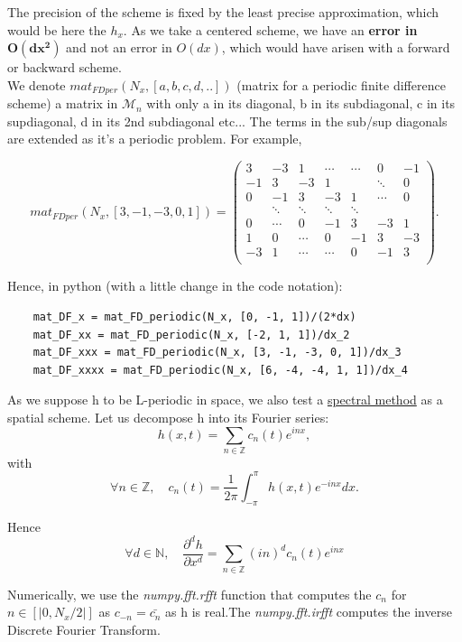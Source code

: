 \documentclass[12pt]{article}
\begin{document}
The precision of the scheme is fixed by the least precise approximation, which would be here the $h_x$. As we take a 
centered scheme, we have an \textbf{error in }$\boldsymbol{O(dx^2 )}$ and not an error in $O(dx)$, which would have 
arisen with a forward or backward scheme. \\

We denote $ mat_{FDper}(N_x, [a, b, c, d,..])$ (matrix for a periodic finite difference scheme) a matrix in $\mathcal{M}_n$ with only a in its diagonal, b in its subdiagonal, c in its supdiagonal, d in its 2nd subdiagonal etc... The terms in the sub/sup diagonals are extended as it's a periodic problem. For example, 

\begin{equation}
mat_{FDper}(N_x, [3, -1, -3,0,1]) = \begin{pmatrix} 3&-3&1&\cdots&\cdots&0&-1\\-1&3&-3&1&&\ddots&0\\0&-1&3&-3&1&\cdots&0\\&\ddots&\ddots&\ddots&\ddots&\\0&\cdots&0&-1&3&-3&1\\1&0&\cdots&0&-1&3&-3\\-3&1&\cdots&\cdots&0&-1&3\\\end{pmatrix}.
\end{equation}


Hence, in python (with a little change in the code notation): 
\begin{verbatim}
    mat_DF_x = mat_FD_periodic(N_x, [0, -1, 1])/(2*dx)
    mat_DF_xx = mat_FD_periodic(N_x, [-2, 1, 1])/dx_2
    mat_DF_xxx = mat_FD_periodic(N_x, [3, -1, -3, 0, 1])/dx_3
    mat_DF_xxxx = mat_FD_periodic(N_x, [6, -4, -4, 1, 1])/dx_4
\end{verbatim}

\vspace{0.5cm}

As we suppose h to be L-periodic in space, we also test a \underline{spectral method} as a spatial scheme. Let
 us decompose h into its Fourier series: $$h(x, t) = \sum_{n\in \mathbb{Z}} c_n(t)e^{inx},$$
with $$\forall n \in \mathbb{Z}, \quad c_n(t) = \frac{1}{2\pi}\int_{-\pi}^{\pi}h(x,t) e^{-inx}dx.$$

Hence $$\forall d \in \mathbb{N},\quad \frac{\partial^d h}{\partial x^d} = \sum_{n\in \mathbb{Z}} (in)^dc_n(t)e^{inx}$$ 

Numerically, we use the \textit{numpy.fft.rfft} function that computes the $c_n$ for $n\in [|0,N_x/2|]$ as $c_{-n} = \bar{c_n}$ as h is real.The \textit{numpy.fft.irfft} computes the inverse Discrete Fourier Transform.
\end{document}
